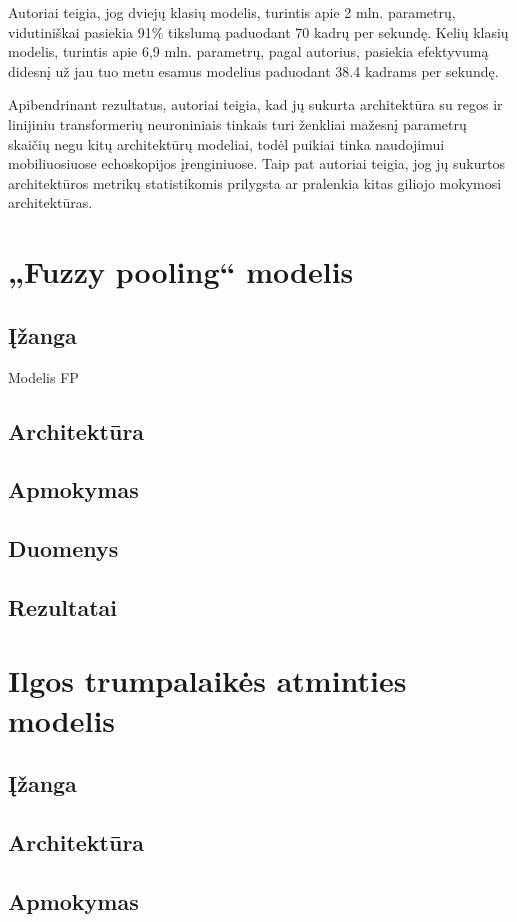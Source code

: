 \documentclass[fleqn]{VUMIFKompMagistrinis}
\begin{document}
Autoriai teigia, jog dviejų klasių modelis, turintis apie 2 mln. parametrų, vidutiniškai pasiekia 91\% tikslumą paduodant 70 kadrų per sekundę. Kelių klasių modelis, turintis apie 6,9 mln. parametrų, pagal autorius, pasiekia efektyvumą didesnį už jau tuo metu esamus modelius paduodant 38.4 kadrams per sekundę.  
\par
Apibendrinant rezultatus, autoriai teigia, kad jų sukurta architektūra su regos ir linijiniu transformerių neuroniniais tinkais turi ženkliai mažesnį parametrų skaičių negu kitų architektūrų modeliai, todėl puikiai tinka naudojimui mobiliuosiuose echoskopijos įrenginiuose. Taip pat autoriai teigia, jog jų sukurtos architektūros metrikų statistikomis prilygsta ar pralenkia kitas giliojo mokymosi architektūras.\cite{PAY21} 

\section{„Fuzzy pooling“ modelis}
\subsection{Įžanga}
Modelis FP \cite{HASAN2023}
\subsection{Architektūra}
\subsection{Apmokymas}
\subsection{Duomenys}
\subsection{Rezultatai}

\section{Ilgos trumpalaikės atminties modelis}
\subsection{Įžanga}
\subsection{Architektūra}
\subsection{Apmokymas}
\end{document}
